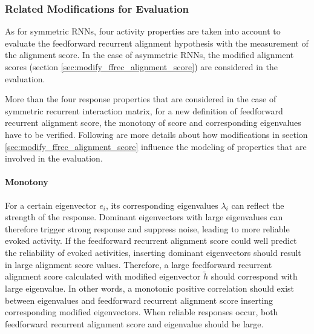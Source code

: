 \documentclass[11pt]{article}
\begin{document}
	\subsubsection{Related Modifications for Evaluation} \label{sec:modification_asym}
	As for symmetric RNNs, four activity properties are taken into account to evaluate the feedforward recurrent alignment hypothesis with the measurement of the alignment score. In the case of asymmetric RNNs, the modified alignment scores (section \ref{sec:modify_ffrec_alignment_score}) are considered in the evaluation. 
	
	More than the four response properties that are considered in the case of symmetric recurrent interaction matrix, for a new definition of feedforward recurrent alignment score, the monotony of score and corresponding eigenvalues have to be verified. Following are more details about how modifications in section \ref{sec:modify_ffrec_alignment_score} influence the modeling of properties that are involved in the evaluation. 
	
	\paragraph{Monotony} For a certain eigenvector $e_i$, its corresponding eigenvalues $\lambda_i$ can reflect the strength of the response. %
	Dominant eigenvectors with large eigenvalues can therefore trigger strong response and suppress noise, leading to more reliable evoked activity. If the feedforward recurrent alignment score could well predict the reliability of evoked activities, inserting dominant eigenvectors should result in large alignment score values. Therefore, a large feedforward recurrent alignment score calculated with modified eigenvector $\tilde{h}$ should correspond with large eigenvalue. In other words, a monotonic positive correlation should exist between eigenvalues and feedforward recurrent alignment score inserting corresponding modified eigenvectors. When reliable responses occur, both feedforward recurrent alignment score and eigenvalue should be large.  
	
\end{document}

